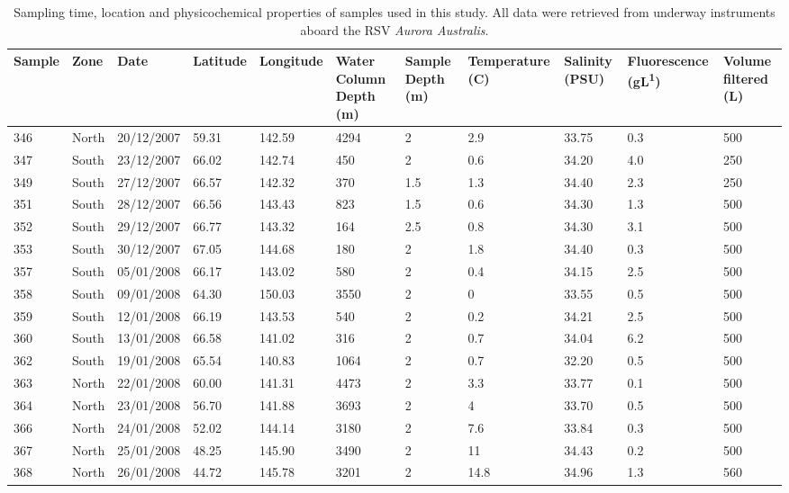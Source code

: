 \begin{landscape}
\begin{table}
\sffamily
\caption[Details of samples used in Polar Front study]{\sffamily{}Sampling time, location and physicochemical properties of samples used in this study.
All data were retrieved from underway instruments aboard the RSV \textit{Aurora Australis}.}
\label{tab:samplelist}
\begin{tabu} to\linewidth{llllXXXZXXX}
\toprule
\textbf{Sample} & \textbf{Zone} & \textbf{Date} & \textbf{Latitude} & \textbf{Longitude} & \textbf{Water \linebreak Column \linebreak Depth (m)} & \textbf{Sample Depth (m)} & \textbf{Temperature (\textdegree{}C)} & \textbf{Salinity (PSU)} & \textbf{Fluorescence \linebreak (\textmu{}gL\textsuperscript{\textminus{}1})} & \textbf{Volume \linebreak filtered (L)}\\
\midrule

346 & North & 20/12/2007 & \textminus{}59.31 & 142.59 & 4294 & 2 & 2.9 & 33.75 & 0.3 & 500\\
347 & South & 23/12/2007 & \textminus{}66.02 & 142.74 & 450 & 2 & 0.6 & 34.20 & 4.0 & 250\\
349 & South & 27/12/2007 & \textminus{}66.57 & 142.32 & 370 & 1.5 & \textminus{}1.3 & 34.40 & 2.3 & 250\\
351 & South & 28/12/2007 & \textminus{}66.56 & 143.43 & 823 & 1.5 & \textminus{}0.6 & 34.30 & 1.3 & 500\\
352 & South & 29/12/2007 & \textminus{}66.77 & 143.32 & 164 & 2.5 & \textminus{}0.8 & 34.30 & 3.1 & 500\\
353 & South & 30/12/2007 & \textminus{}67.05 & 144.68 & 180 & 2 & \textminus{}1.8 & 34.40 & 0.3 & 500\\
357 & South & 05/01/2008 & \textminus{}66.17 & 143.02 & 580 & 2 & \textminus{}0.4 & 34.15 & 2.5 & 500\\
358 & South & 09/01/2008 & \textminus{}64.30 & 150.03 & 3550 & 2 & 0 & 33.55 & 0.5 & 500\\
359 & South & 12/01/2008 & \textminus{}66.19 & 143.53 & 540 & 2 & \textminus{}0.2 & 34.21 & 2.5 & 500\\
360 & South & 13/01/2008 & \textminus{}66.58 & 141.02 & 316 & 2 & \textminus{}0.7 & 34.04 & 6.2 & 500\\
362 & South & 19/01/2008 & \textminus{}65.54 & 140.83 & 1064 & 2 & 0.7 & 32.20 & 0.5 & 500\\
363 & North & 22/01/2008 & \textminus{}60.00 & 141.31 & 4473 & 2 & 3.3 & 33.77 & 0.1 & 500\\
364 & North & 23/01/2008 & \textminus{}56.70 & 141.88 & 3693 & 2 & 4 & 33.70 & 0.5 & 500\\
366 & North & 24/01/2008 & \textminus{}52.02 & 144.14 & 3180 & 2 & 7.6 & 33.84 & 0.3 & 500\\
367 & North & 25/01/2008 & \textminus{}48.25 & 145.90 & 3490 & 2 & 11 & 34.43 & 0.2 & 500\\
368 & North & 26/01/2008 & \textminus{}44.72 & 145.78 & 3201 & 2 & 14.8 & 34.96 & 1.3 & 560\\


\end{tabu}
\end{table}
\end{landscape}
